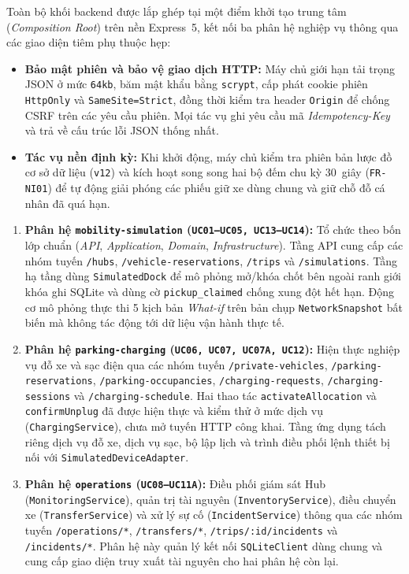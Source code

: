 Toàn bộ khối backend được lắp ghép tại một điểm khởi tạo trung tâm (\textit{Composition Root}) trên nền Express~5, kết nối ba phân hệ nghiệp vụ thông qua các giao diện tiêm phụ thuộc hẹp:
\begin{itemize}[leftmargin=*,nosep]
    \item \textbf{Bảo mật phiên và bảo vệ giao dịch HTTP:} Máy chủ giới hạn tải trọng JSON ở mức \texttt{64kb}, băm mật khẩu bằng \texttt{scrypt}, cấp phát cookie phiên \texttt{HttpOnly} và \texttt{SameSite=Strict}, đồng thời kiểm tra header \texttt{Origin} để chống CSRF trên các yêu cầu phiên. Mọi tác vụ ghi yêu cầu mã \textit{Idempotency-Key} và trả về cấu trúc lỗi JSON thống nhất.
    \item \textbf{Tác vụ nền định kỳ:} Khi khởi động, máy chủ kiểm tra phiên bản lược đồ cơ sở dữ liệu (\texttt{v12}) và kích hoạt song song hai bộ đếm chu kỳ 30~giây (\texttt{FR-NI01}) để tự động giải phóng các phiếu giữ xe dùng chung và giữ chỗ đỗ cá nhân đã quá hạn.
\end{itemize}

\begin{enumerate}[leftmargin=*,nosep]
    \item \textbf{Phân hệ \texttt{mobility-simulation} (\texttt{UC01--UC05, UC13--UC14}):} Tổ chức theo bốn lớp chuẩn (\textit{API}, \textit{Application}, \textit{Domain}, \textit{Infrastructure}). Tầng API cung cấp các nhóm tuyến \texttt{/hubs}, \texttt{/vehicle-reservations}, \texttt{/trips} và \texttt{/simulations}. Tầng hạ tầng dùng \texttt{SimulatedDock} để mô phỏng mở/khóa chốt bên ngoài ranh giới khóa ghi SQLite và dùng cờ \texttt{pickup\_claimed} chống xung đột hết hạn. Động cơ mô phỏng thực thi 5 kịch bản \textit{What-if} trên bản chụp \texttt{NetworkSnapshot} bất biến mà không tác động tới dữ liệu vận hành thực tế.
    \item \textbf{Phân hệ \texttt{parking-charging} (\texttt{UC06, UC07, UC07A, UC12}):} Hiện thực nghiệp vụ đỗ xe và sạc điện qua các nhóm tuyến \texttt{/private-vehicles}, \texttt{/parking-reservations}, \texttt{/parking-occupancies}, \texttt{/charging-requests}, \texttt{/charging-sessions} và \texttt{/charging-schedule}. Hai thao tác \texttt{activateAllocation} và \texttt{confirmUnplug} đã được hiện thực và kiểm thử ở mức dịch vụ (\texttt{ChargingService}), chưa mở tuyến HTTP công khai. Tầng ứng dụng tách riêng dịch vụ đỗ xe, dịch vụ sạc, bộ lập lịch và trình điều phối lệnh thiết bị nối với \texttt{SimulatedDeviceAdapter}.
    \item \textbf{Phân hệ \texttt{operations} (\texttt{UC08--UC11A}):} Điều phối giám sát Hub (\texttt{MonitoringService}), quản trị tài nguyên (\texttt{InventoryService}), điều chuyển xe (\texttt{TransferService}) và xử lý sự cố (\texttt{IncidentService}) thông qua các nhóm tuyến \texttt{/operations/*}, \texttt{/transfers/*}, \texttt{/trips/:id/incidents} và \texttt{/incidents/*}. Phân hệ này quản lý kết nối \texttt{SQLiteClient} dùng chung và cung cấp giao diện truy xuất tài nguyên cho hai phân hệ còn lại.
\end{enumerate}

